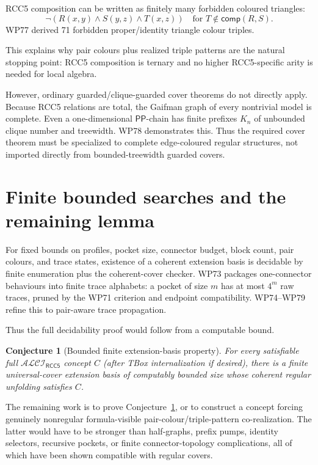 \documentclass[11pt]{article}
\newtheorem{conjecture}[theorem]{Conjecture}
\newcommand{\PP}{\mathsf{PP}}
\newcommand{\comp}{\mathsf{comp}}
\newcommand{\ALCI}{\mathcal{ALCI}_{\mathsf{RCC5}}}
\begin{document}
RCC5 composition can be written as finitely many forbidden coloured triangles:
\[
\neg(R(x,y)\wedge S(y,z)\wedge T(x,z))
\quad\text{for }T\notin\comp(R,S).
\]
WP77 derived 71 forbidden proper/identity triangle colour triples.

This explains why pair colours plus realized triple patterns are the natural stopping point: RCC5 composition is ternary and no higher RCC5-specific arity is needed for local algebra.

However, ordinary guarded/clique-guarded cover theorems do not directly apply.  Because RCC5 relations are total, the Gaifman graph of every nontrivial model is complete.  Even a one-dimensional $\PP$-chain has finite prefixes $K_n$ of unbounded clique number and treewidth.  WP78 demonstrates this.  Thus the required cover theorem must be specialized to complete edge-coloured regular structures, not imported directly from bounded-treewidth guarded covers.

\section{Finite bounded searches and the remaining lemma}

For fixed bounds on profiles, pocket size, connector budget, block count, pair colours, and trace states, existence of a coherent extension basis is decidable by finite enumeration plus the coherent-cover checker.  WP73 packages one-connector behaviours into finite trace alphabets: a pocket of size $m$ has at most $4^m$ raw traces, pruned by the WP71 criterion and endpoint compatibility.  WP74--WP79 refine this to pair-aware trace propagation.

Thus the full decidability proof would follow from a computable bound.

\begin{conjecture}[Bounded finite extension-basis property]\label{conj:basis}
For every satisfiable full $\ALCI$ concept $C$ (after TBox internalization if desired), there is a finite universal-cover extension basis of computably bounded size whose coherent regular unfolding satisfies $C$.
\end{conjecture}

The remaining work is to prove Conjecture~\ref{conj:basis}, or to construct a concept forcing genuinely nonregular formula-visible pair-colour/triple-pattern co-realization.  The latter would have to be stronger than half-graphs, prefix pumps, identity selectors, recursive pockets, or finite connector-topology complications, all of which have been shown compatible with regular covers.
\end{document}
